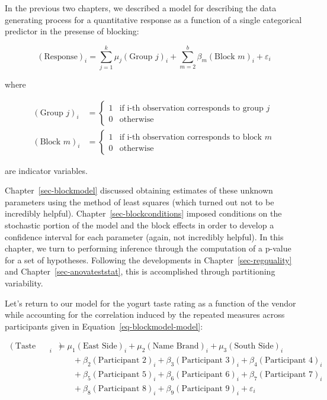 \documentclass[
  letterpaper,
  DIV=11,
  numbers=noendperiod]{scrreprt}
\theoremstyle{definition}
\theoremstyle{definition}
\theoremstyle{plain}
\theoremstyle{remark}
\begin{document}
In the previous two chapters, we described a model for describing the
data generating process for a quantitative response as a function of a
single categorical predictor in the presense of blocking:

\[(\text{Response})_i = \sum_{j=1}^{k} \mu_j (\text{Group } j)_i + \sum_{m=2}^{b} \beta_m (\text{Block } m)_i + \varepsilon_i\]

where

\[
\begin{aligned}
  (\text{Group } j)_i 
    &= \begin{cases} 1 & \text{if i-th observation corresponds to group } j \\ 0 & \text{otherwise} \end{cases} \\
  (\text{Block } m)_i
    &= \begin{cases} 1 & \text{if i-th observation corresponds to block } m \\ 0 & \text{otherwise} \end{cases}
\end{aligned}
\]

are indicator variables.

Chapter~\ref{sec-blockmodel} discussed obtaining estimates of these
unknown parameters using the method of least squares (which turned out
not to be incredibly helpful). Chapter~\ref{sec-blockconditions} imposed
conditions on the stochastic portion of the model and the block effects
in order to develop a confidence interval for each parameter (again, not
incredibly helpful). In this chapter, we turn to performing inference
through the computation of a p-value for a set of hypotheses. Following
the developments in Chapter~\ref{sec-regquality} and
Chapter~\ref{sec-anovateststat}, this is accomplished through
partitioning variability.

Let's return to our model for the yogurt taste rating as a function of
the vendor while accounting for the correlation induced by the repeated
measures across participants given in
Equation~\ref{eq-blockmodel-model}:

\[
\begin{aligned}
  (\text{Taste Rating})_i &= \mu_1 (\text{East Side})_i + \mu_2 (\text{Name Brand})_i + \mu_3 (\text{South Side})_i \\
    &\qquad + \beta_2 (\text{Participant 2})_i + \beta_3 (\text{Participant 3})_i + \beta_4 (\text{Participant 4})_i \\
    &\qquad + \beta_5 (\text{Participant 5})_i + \beta_6 (\text{Participant 6})_i + \beta_7 (\text{Participant 7})_i \\
    &\qquad + \beta_8 (\text{Participant 8})_i + \beta_9 (\text{Participant 9})_i + \varepsilon_i
\end{aligned}
\]
\end{document}
